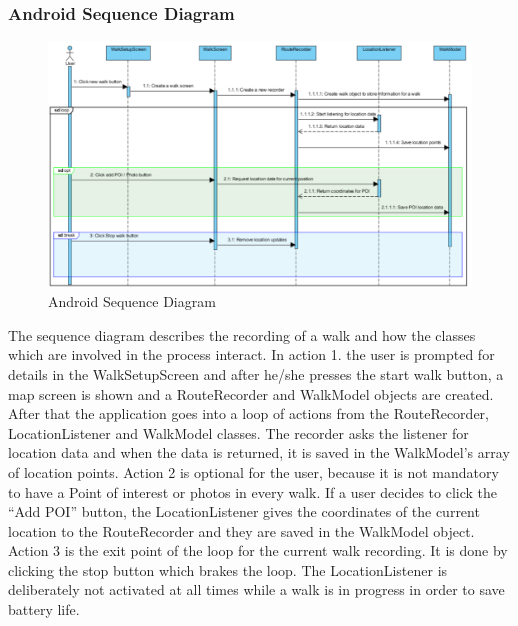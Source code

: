 \documentclass[12pt]{article}
\begin{document}
\subsubsection{Android Sequence Diagram}\clearpage
\begin{figure}[htp]

\begin{adjustwidth}{-3cm}{0cm}
\centering
\includegraphics[scale=0.90]{Design/route_record_sequence_diagram.PNG}
\caption{Android Sequence Diagram}
\label{Android Sequence Diagram}
\end{adjustwidth}
\end{figure}
The sequence diagram describes the recording of a walk and how the classes which are involved in the process interact.
In action 1. the user is prompted for details in the WalkSetupScreen and after he/she presses the start walk button, a map screen is shown and a RouteRecorder and WalkModel objects are created. After that the application goes into a loop of actions from the RouteRecorder, LocationListener and WalkModel classes. The recorder asks the listener for location data and when the data is returned, it is saved in the WalkModel's array of location points.
Action 2 is optional for the user, because it is not mandatory to have a Point of interest or photos in every walk. If a user decides to click the “Add POI” button, the LocationListener gives the coordinates of the current location to the RouteRecorder and they are saved in the WalkModel object.
Action 3 is the exit point of the loop for the current walk recording. It is done by clicking the stop button which brakes the loop.
The LocationListener is deliberately not activated at all times while a walk is in progress in order to save battery life.
\end{document}
